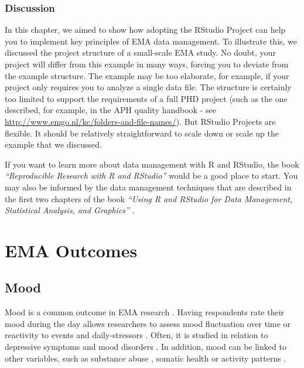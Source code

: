\documentclass[]{book}
\begin{document}
\section{Discussion}\label{discussion}

In this chapter, we aimed to show how adopting the RStudio Project can
help you to implement key principles of EMA data management. To
illustrate this, we discussed the project structure of a small-scale EMA
study. No doubt, your project will differ from this example in many
ways, forcing you to deviate from the example structure. The example may
be too elaborate, for example, if your project only requires you to
analyze a single data file. The structure is certainly too limited to
support the requirements of a full PHD project (such as the one
described, for example, in the APH quality handbook - see
\url{http://www.emgo.nl/kc/folders-and-file-names/}). But RStudio
Projects are flexible. It should be relatively straightforward to scale
down or scale up the example that we discussed.

If you want to learn more about data management with R and RStudio, the
book \emph{``Reproducible Research with R and RStudio''}
\citep{gandrud2015} would be a good place to start. You may also be
informed by the data management techniques that are described in the
first two chapters of the book \emph{``Using R and RStudio for Data
Management, Statistical Analysis, and Graphics''} \citep{horton2015}.

\part{EMA Outcomes}\label{part-ema-outcomes}

\chapter{Mood}\label{mood}

 


Mood is a common outcome in EMA research
\citep{Myin-Germeys2016, Desmet2016}. Having respondents rate their mood
during the day allows researchers to assess mood fluctuation over time
or reactivity to events and daily-stressors \citep{Wenze2010}. Often, it
is studied in relation to depressive symptoms and mood disorders
\citep{AanhetRot2012}. In addition, mood can be linked to other
variables, such as substance abuse \citep{Kirchner2013, Serre2015},
somatic health \citep{Engel2016, Moore2016} or activity patterns
\citep{Dunton2017, Marszalek2014}.
\end{document}
